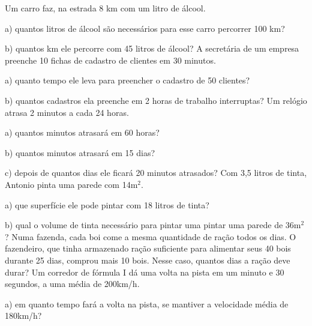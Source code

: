 \begin{exercicios}
	\exitem{} Um carro faz, na estrada 8 km com um litro de álcool.

		a) quantos litros de álcool são necessários para esse carro percorrer 100 km?

		b) quantos km ele percorre com 45 litros de álcool?
	\exitem{} A secretária de um empresa  preenche 10 fichas de cadastro de clientes  em 30 minutos.

		a) quanto tempo ele leva para preencher o cadastro de  50 clientes?

		b) quantos cadastros  ela  preenche em 2 horas de trabalho interruptas?
	\exitem{} Um relógio atrasa 2 minutos a cada 24 horas.

		a) quantos minutos atrasará em 60 horas?
	
		b) quantos minutos atrasará em 15 dias?
	
		c) depois de quantos dias ele ficará 20 minutos atrasados?	
	\exitem{} Com 3,5 litros de tinta, Antonio pinta uma parede com 14m$^2$. 
	
	a) que superfície ele pode pintar com 18 litros de tinta?			
	
	b) qual o volume de tinta necessário para pintar uma pintar uma parede de 36m$^2$ ?
	\exitem{} Numa fazenda, cada boi come a mesma quantidade de ração todos os dias. O fazendeiro, que tinha armazenado ração suficiente para alimentar seus 40 bois durante 25 dias, comprou mais 10 bois. Nesse caso, quantos dias a ração deve durar?		
	\exitem{} Um corredor de fórmula I dá uma volta na pista em um minuto e 30 segundos, a uma média de 200km/h. 
	
	a) em quanto tempo fará a volta na pista, se mantiver a velocidade média de 180km/h?	
	

\end{exercicios}
